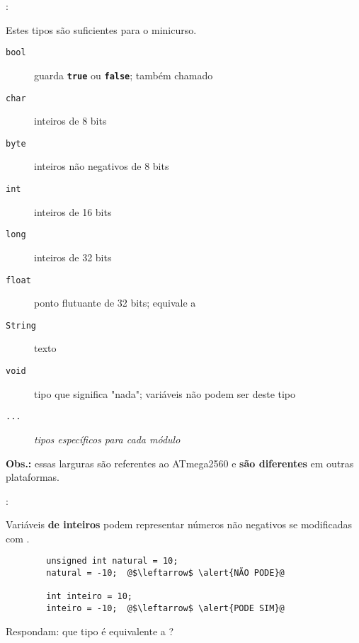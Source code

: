 \begin{frame}{\insertsection: \insertsubsection}

	Estes tipos são suficientes para o minicurso.

	\begin{description}
		\item[\texttt{bool}] guarda \textbf{\texttt{true}} ou \textbf{\texttt{false}}; também chamado \texttt{}
		\item[\texttt{char}] inteiros de 8 bits
		\item[\texttt{byte}] inteiros não negativos de 8 bits
		\item[\texttt{int}] inteiros de 16 bits
		\item[\texttt{long}] inteiros de 32 bits
		\item[\texttt{float}] ponto flutuante de 32 bits; equivale a \texttt{}
		\item[\texttt{String}] texto
		\item[\texttt{void}] tipo que significa "nada"; variáveis não podem ser deste tipo
		\item[\texttt{...}] \emph{tipos específicos para cada módulo}
	\end{description}

	\vfill
	\textbf{Obs.:} essas larguras são referentes ao ATmega2560 e \textbf{são diferentes} em outras plataformas.

\end{frame}


\begin{frame}[fragile]{\insertsection: \insertsubsection}

	Variáveis \textbf{de inteiros} podem representar números não negativos se modificadas com \texttt{}.
	\begin{verbatim}
		unsigned int natural = 10;
		natural = -10;  @$\leftarrow$ \alert{NÃO PODE}@

		int inteiro = 10;
		inteiro = -10;  @$\leftarrow$ \alert{PODE SIM}@
	\end{verbatim}

	\pause
	\bigskip
	Respondam: que tipo é equivalente a \texttt{}?\\
	\only<0|handout:2>{R: \texttt{\HighlightSpecial{byte}}}

\end{frame}


